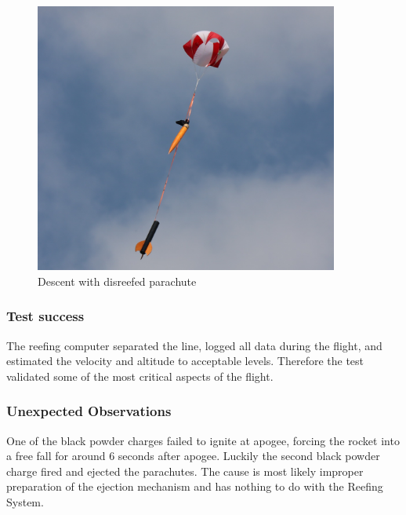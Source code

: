 \begin{figure}[h!]
	\centering
	\includegraphics[width=10cm]{images/toyger-parachute}
	\caption{Descent with disreefed parachute}
	\label{fig:toyger-parachute}
\end{figure}

\subsubsection{Test success}
The reefing computer separated the line, logged all data during the flight, and estimated the velocity and altitude to acceptable levels. Therefore the test validated some of the most critical aspects of the flight. 

\subsubsection{Unexpected Observations}
One of the black powder charges failed to ignite at apogee, forcing the rocket into a free fall for around 6 seconds after apogee. Luckily the second black powder charge fired and ejected the parachutes. The cause is most likely improper preparation of the ejection mechanism and has nothing to do with the Reefing System.

